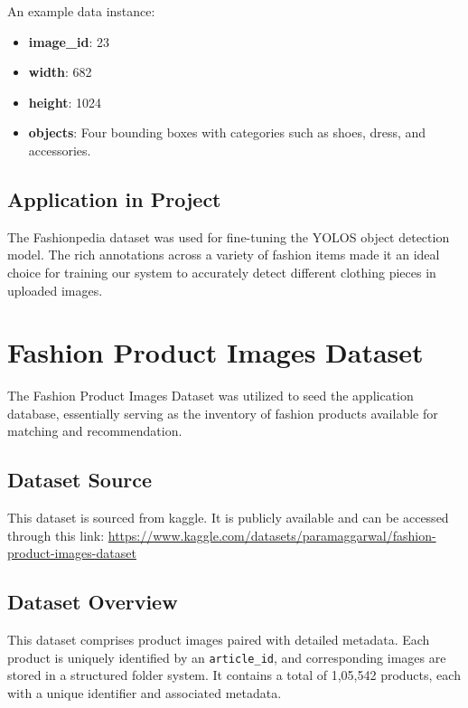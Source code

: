 An example data instance:

\vspace{-1.25em}
\begin{itemize}
    \setlength\itemsep{-1.5em}
    \item \textbf{image\_id}: 23
    \item \textbf{width}: 682
    \item \textbf{height}: 1024
    \item \textbf{objects}: Four bounding boxes with categories such as shoes, dress, and accessories.
\end{itemize}

\subsection{Application in Project}

The Fashionpedia dataset was used for fine-tuning the YOLOS object detection model. The rich annotations across a variety of fashion items made it an ideal choice for training our system to accurately detect different clothing pieces in uploaded images.

\section{Fashion Product Images Dataset}

The Fashion Product Images Dataset was utilized to seed the application database, essentially serving as the inventory of fashion products available for matching and recommendation.

\subsection{Dataset Source}
This dataset is sourced from kaggle. It is publicly available and can be accessed through this link: \href{https://www.kaggle.com/datasets/paramaggarwal/fashion-product-images-dataset}{https://www.kaggle.com/datasets/paramaggarwal/fashion-product-images-dataset}

\subsection{Dataset Overview}

This dataset comprises product images paired with detailed metadata. Each product is uniquely identified by an \texttt{article\_id}, and corresponding images are stored in a structured folder system. It contains a total of 1,05,542 products, each with a unique identifier and associated metadata.

